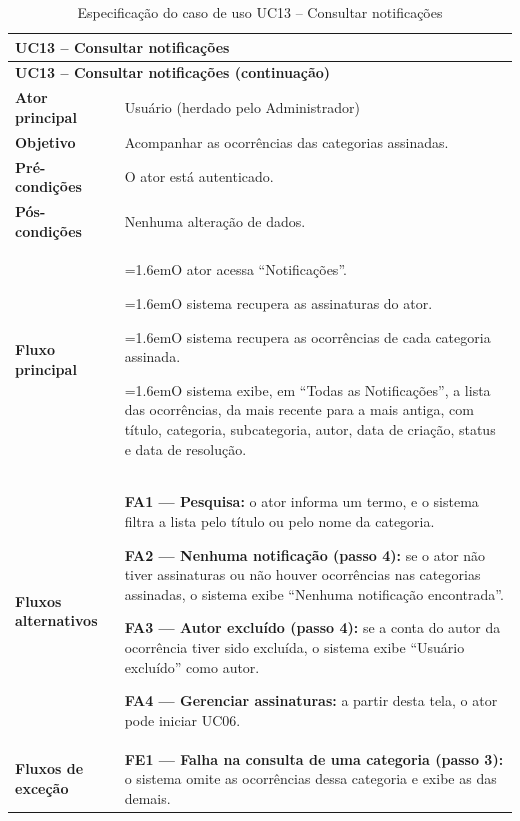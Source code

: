 \documentclass[12pt,a4paper]{article}
\newcommand{\ucitem}[2]{\par\noindent\hangindent=1.6em\hangafter=1\makebox[1.6em][l]{#1}#2}
\begin{document}
\begin{longtable}{|p{}|p{}|}
\caption{Especificação do caso de uso UC13 -- Consultar notificações}
\label{tab:uc13} \\
\hline
\multicolumn{2}{|l|}{\textbf{UC13 -- Consultar notificações}} \\
\hline
\endfirsthead

\hline
\multicolumn{2}{|l|}{\textbf{UC13 -- Consultar notificações (continuação)}} \\
\hline
\endhead

\hline
\endfoot
\textbf{Ator principal} & Usuário (herdado pelo Administrador) \\ \hline
\textbf{Objetivo} & Acompanhar as ocorrências das categorias assinadas. \\ \hline
\textbf{Pré-condições} & O ator está autenticado. \\ \hline
\textbf{Pós-condições} & Nenhuma alteração de dados. \\ \hline
\textbf{Fluxo principal} &
\ucitem{1.}{O ator acessa ``Notificações''.}
\ucitem{2.}{O sistema recupera as assinaturas do ator.}
\ucitem{3.}{O sistema recupera as ocorrências de cada categoria assinada.}
\ucitem{4.}{O sistema exibe, em ``Todas as Notificações'', a lista das ocorrências, da mais recente para a mais antiga, com título, categoria, subcategoria, autor, data de criação, status e data de resolução.} \\ \hline
\textbf{Fluxos alternativos} &
\noindent \textbf{FA1 — Pesquisa:} o ator informa um termo, e o sistema filtra a lista pelo título ou pelo nome da categoria.
\par\smallskip\noindent \textbf{FA2 — Nenhuma notificação (passo 4):} se o ator não tiver assinaturas ou não houver ocorrências nas categorias assinadas, o sistema exibe ``Nenhuma notificação encontrada''.
\par\smallskip\noindent \textbf{FA3 — Autor excluído (passo 4):} se a conta do autor da ocorrência tiver sido excluída, o sistema exibe ``Usuário excluído'' como autor.
\par\smallskip\noindent \textbf{FA4 — Gerenciar assinaturas:} a partir desta tela, o ator pode iniciar UC06. \\ \hline
\textbf{Fluxos de exceção} &
\noindent \textbf{FE1 — Falha na consulta de uma categoria (passo 3):} o sistema omite as ocorrências dessa categoria e exibe as das demais. \\
\end{longtable}
\end{document}
